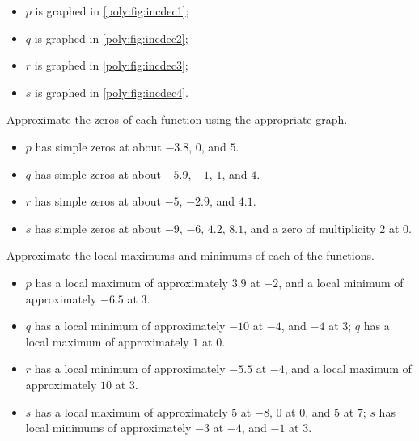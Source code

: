 \begin{exercises}
\begin{problem}
\begin{subproblem}
\begin{shortsolution}
		\begin{itemize}
			\item $p$ is graphed in \vref{poly:fig:incdec1};
			\item $q$ is graphed in \vref{poly:fig:incdec2};
			\item $r$ is graphed in \vref{poly:fig:incdec3};
			\item $s$ is graphed in \vref{poly:fig:incdec4}.
		\end{itemize}
	\end{shortsolution}
\end{subproblem}
\begin{subproblem}
	Approximate the zeros of each function using the appropriate graph.
	\begin{shortsolution}
		\begin{itemize}
			\item $p$ has simple zeros at about $-3.8$, $0$, and $5$.
			\item $q$ has simple zeros at about $-5.9$, $-1$, $1$, and $4$.
			\item $r$ has simple zeros at about $-5$, $-2.9$, and $4.1$.
			\item $s$ has simple zeros at about $-9$, $-6$, $4.2$, $8.1$, and a zero of multiplicity $2$ at $0$.
		\end{itemize}
	\end{shortsolution}
\end{subproblem}
\begin{subproblem}
	Approximate the local maximums and minimums of each of the functions.
	\begin{shortsolution}
		\begin{itemize}
			\item $p$ has a local maximum of approximately $3.9$ at $-2$, and a local minimum of approximately $-6.5$ at $3$.
			\item $q$ has a local minimum of approximately $-10$ at $-4$, and $-4$ at $3$; $q$ has a local maximum of approximately $1$ at $0$.
			\item $r$ has a local minimum of approximately $-5.5$ at $-4$, and a local maximum of approximately $10$ at $3$.
			\item $s$ has a local maximum of approximately $5$ at $-8$, $0$ at $0$, and $5$ at  $7$; $s$ has local minimums 
			of approximately $-3$ at $-4$, and $-1$ at $3$.
		\end{itemize}
	\end{shortsolution}
\end{subproblem}
\begin{subproblem}

\end{subproblem}
\end{problem}
\end{exercises}
